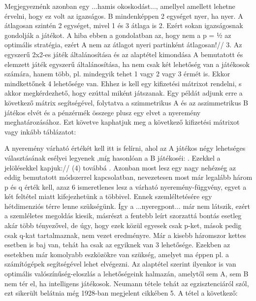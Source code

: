 \documentclass  {article}
\begin{document}
Megjegyeznénk azonban egy ...hamis okoskodást..., amellyel amellett lehetne érvelni, hogy ez volt az igazságos. B mindenképpen 2 egységet nyer, ha nyer. A átlagosan szintén 2 egységet, mivel 1 és 3 átlaga is 2. Ezért sokan igazságosnak gondolják a játékot. A hiba ebben a gondolatban az, hogy nem a p = ½ az optimális stratégia, ezért A nem az átlagot nyeri partinként átlagosan!//        
3. Az egyszerű 2x2-es játék általánosítása és az alaptétel kimondása
A bemutatott és elemzett játék egyszerű általánosítása, ha nem csak két lehetőség van a játékosok számára, hanem több, pl. mindegyik tehet 1 vagy 2 vagy 3 érmét is. Ekkor mindkettőnek 4 lehetősége van. Ehhez is kell egy kifizetési mátrixot rendelni, s akkor megkérdezhető, hogy ezúttal miként játszanak. Egy példát adjunk erre a következő mátrix segítségével, folytatva a szimmetrikus A és az aszimmetrikus B játékos elvét és a pénzérmék összege plusz egy elvet a nyeremény meghatározásához. Ezt követve kaphatjuk meg a következő kifizetési mátrixot vagy inkább táblázatot:


 
A nyeremény várható értékét kell itt is felírni, ahol az A játékos négy lehetséges választásának esélyei legyenek    ,míg hasonlóan a B játékoséi:   . Ezekkel a jelölésekkel kapjuk://
 (4)                 
 továbbá        .
Azonban most lesz egy nagy nehézség az eddig bemutatott módszerrel kapcsolatban, nevezetesen most már legalább három p és q érték kell, azaz 6 ismeretlenes lesz a várható nyeremény-függvény, egyet a két feltétel miatt kifejezhetünk a többivel. Ennek szemléltetésére egy hétdimenziós térre lenne szükségünk. Így a ...nyeregpont... már nem látszik, ezért a szemléletes megoldás kiesik, másrészt a fentebb leírt szorzattá bontás esetleg akár több tényezővel, de úgy, hogy ezek közül egyesek csak p-ket, mások pedig csak q-kat tartalmaznak, nem vezet eredményre. Már a kisebb háromszor kettes esetben is baj van, tehát ha csak az egyiknek van 3 lehetősége. Ezekben az esetekben már komolyabb eszközökre van szükség, amelyet ma éppen pl. a számítógépek segítségével lehet elvégezni. Az alaptétel szerint ilyenkor is van optimális valószínűség-eloszlás a lehetőségeink halmazán, amelytől sem A, sem B nem tér el, ha intelligens játékosok. Neumann tétele tehát az egzisztenciáról szól, ezt sikerült belátnia még 1928-ban megjelent cikkében 5. A tétel  a következő: \cite{neumannj}
\end{document}
